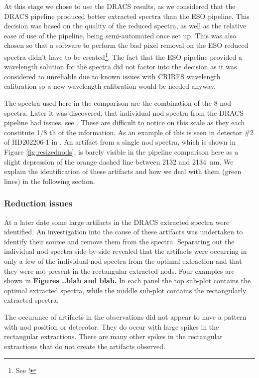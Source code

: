 At this stage we chose to use the DRACS results, as we considered that the DRACS pipeline produced better extracted spectra than the ESO pipeline. This decision was based on the quality of the reduced spectra, as well as the relative ease of use of the pipeline, being semi-automated once set up. This was also chosen so that a software to perform the bad pixel removal on the ESO reduced spectra didn't have to be created\footnote{See !}. The fact that the ESO pipeline provided a wavelength solution for the spectra did not factor into the decision as it was considered to unreliable due to known issues with CRIRES wavelength calibration so a new wavelength calibration would be needed anyway.

The spectra used here in the comparison are the combination of the 8 nod spectra. Later it was discovered, that individual nod spectra from the DRACS pipeline had issues, see . These are difficult to notice on this scale as they each constitute 1/8 th of the information. As an example of this is seen in detector \#2 of HD202206-1 in . An artifact from a single nod spectra, which is shown in Figure \ref{fig:resizednods}, is barely visible in the pipeline comparison here as a slight depression of the orange dashed line between 2132 and 2134~nm. We explain the identification of these artifacts and how we deal with them (green lines) in the following section.

\subsubsection{Reduction issues}
\label{subsubsec:reductionartifacts}
At a later date some large artifacts in the DRACS extracted spectra were identified. An investigation into the cause of these artifacts was undertaken to identify their source and remove them from the spectra. Separating out the individual nod spectra side-by-side revealed that the artifacts were occurring in only a few of the individual nod spectra from the optimal extraction and that they were not present in the rectangular extracted nods. Four examples are shown in \textbf{Figures ..blah and blah.} In each panel the top sub-plot contains the optimal extracted spectra, while the middle sub-plot contains the rectangularly extracted spectra.


The occurance of artifacts in the observations did not appear to have a pattern with nod position or detecotor. They do occur with large spikes in the rectangular extractions. There are many other spikes in the rectangular extractions that do not create the artifacts observed. 

